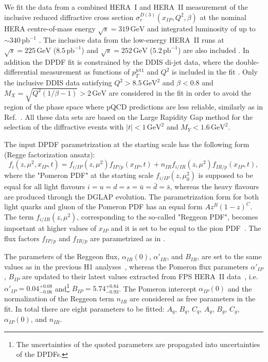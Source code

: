 \documentclass{PoS}
\newcommand{\IP}{I\!\!P}
\newcommand{\IR}{I\!\!R}
\newcommand{\xpom}{x_{\IP}}
\newcommand{\GeV}{\ensuremath{\mathrm{GeV}}\xspace}
\newcommand{\GeVsq}{\ensuremath{\mathrm{GeV}^2}\xspace}
\begin{document}
We fit the data from a combined HERA~I and HERA~II measurement of the inclusive reduced diffractive cross section $\sigma_r^{D(3)}(\xpom, Q^2, \beta)$  at the nominal HERA centre-of-mass energy $\sqrt{s} = 319\,\GeV$ and integrated luminosity of up to $\sim\!\! 340\,\text{pb}^{-1}$  \cite{Aaron:2012ad}.
The inclusive data from the low-energy HERA~II runs at $\sqrt{s} = 225\,\GeV$ ($8.5\,\text{pb}^{-1}$) and $\sqrt{s} = 252\,\GeV$ ($5.2\,\text{pb}^{-1}$) are also included \cite{Aaron:2012zz}.
In addition the DPDF fit is constrained by the DDIS di-jet data, where the double-differential measurement as functions of $p_T^{\mathrm{jet}1}$ and $Q^2$ is included in the fit \cite{Andreev:2014yra}.
Only the inclusive DDIS data satisfying $Q^2 > 8.5\, \GeVsq$ and $\beta < 0.8$ and $M_X = \sqrt{Q^2(1/\beta - 1)} > 2\,\GeV$ are considered in the fit in order to avoid the region of the phase space where pQCD predictions are less reliable, similarly as in Ref.~\cite{Aktas:2006hy}.
All these data sets are based on the Large Rapidity Gap method for the selection of the diffractive events with $|t| < 1\,\GeVsq$ and $M_Y < 1.6\,\GeVsq$.


The input DPDF parametrization at the starting scale has the following form (Regge factorization ansatz):
\begin{equation}
f_i (z, \mu^2, \xpom, t) = f_{i/\IP} (z, \mu^2) f_{\IP/p} (\xpom, t) + n_{\IR} f_{i/\IR} (z, \mu^2) f_{\IR/p} (\xpom, t),
\end{equation}
where the "Pomeron PDF" at the starting scale  $f_{i/\IP}(z, \mu_0^2)$ is supposed to be equal for all light flavours $i=u=d=s = \bar{u} = \bar{d} = \bar{s}$, whereas the heavy flavours are produced through the DGLAP evolution.
The parametrization form for both light quarks and gluon of the Pomeron PDF has an equal form $A z^B (1-z)^C$.
The term $f_{i/\IR} (z, \mu^2)$, corresponding to the so-called "Reggeon PDF", becomes important at higher values of $\xpom$ and it is set to be equal to the pion PDF~\cite{Owens:1984zj}.
The flux factors $f_{\IP/p}$ and $f_{\IR/p}$ are parametrized as in \cite{Aktas:2006hy,Aktas:2007bv}.

The parameters of the Reggeon flux, $\alpha_{\IR}(0)$,  $\alpha'_{\IR}$, and $B_{\IR}$,  are set to the same values as in the previous H1 analyses~\cite{Aktas:2006hy,Aktas:2007bv}, whereas the Pomeron flux parameters $\alpha'_{\IP}$, $B_{\IP}$ are updated to their latest values extracted from FPS HERA~II data~\cite{Aaron:2010aa}, i.e. $\alpha'_{\IP} = 0.04^{+0.08}_{-0.06}$ and\footnote{The uncertainties of the quoted parameters are propagated into uncertainties of the DPDFs.} $B_{\IP} = 5.74^{+0.84}_{-0.93}$.
The Pomeron intercept $\alpha_{\IP}(0)$ and the normalization of the Reggeon term $n_{\IR}$ are considered as free parameters in the fit.
In total there are eight parameters to be fitted: $A_q$, $B_q$, $C_q$, $A_g$, $B_g$, $C_g$, $\alpha_{\IP}(0)$, and $n_{\IR}$.
\end{document}
